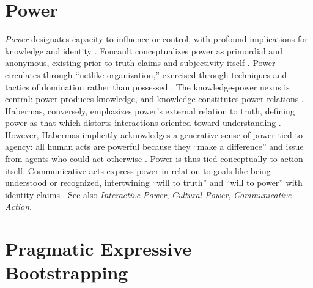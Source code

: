 \documentclass{book}
\begin{document}
\section{Power}

\textit{Power} designates capacity to influence or control, with profound implications for knowledge and identity \parencite{Carspecken2018}. Foucault conceptualizes power as primordial and anonymous, existing prior to truth claims and subjectivity itself \parencite[27--28]{Carspecken1999}. Power circulates through ``netlike organization,'' exercised through techniques and tactics of domination rather than possessed \parencite{Flew1979}. The knowledge-power nexus is central: power produces knowledge, and knowledge constitutes power relations \parencite{habermas1992individuation}. Habermas, conversely, emphasizes power's external relation to truth, defining power as that which distorts interactions oriented toward understanding \parencite[46]{Carspecken1999}. However, Habermas implicitly acknowledges a generative sense of power tied to agency: all human acts are powerful because they ``make a difference'' and issue from agents who could act otherwise \parencite[49]{Carspecken1999}. Power is thus tied conceptually to action itself. Communicative acts express power in relation to goals like being understood or recognized, intertwining ``will to truth'' and ``will to power'' with identity claims \parencite[57, 67]{Carspecken1999}. See also \textit{Interactive Power}, \textit{Cultural Power}, \textit{Communicative Action}.

\section{Pragmatic Expressive Bootstrapping}
\end{document}
